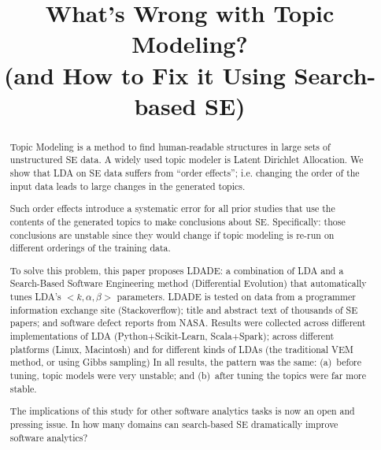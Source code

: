 \documentclass[10pt,conference]{IEEEtran}
\theoremstyle{break}
\begin{document}
\pagestyle{plain}

\title{\textbf{What's Wrong with
Topic Modeling?\\ (and How to Fix it Using Search-based SE)}}


\author{
\and
{}
\and
{}
}

\maketitle


\begin{abstract}
  Topic Modeling is a method to find
  human-readable structures in large sets of unstructured SE data.
  A widely used topic modeler is Latent Dirichlet Allocation. We show that LDA on SE data suffers
  from ``order effects''; i.e. changing the order of the input data leads to
  large changes in the generated topics.

 Such order effects introduce a systematic error for all prior studies that use
 the contents of the generated topics to make conclusions about
 SE. Specifically: those conclusions are unstable since they would change if
 topic modeling is re-run on different orderings of the training data.

To solve this problem, this paper proposes LDADE: a combination of LDA and a
Search-Based Software Engineering method
(Differential Evolution) that automatically tunes LDA's
$<k,\alpha,\beta>$ parameters. LDADE is tested on  data from a programmer
information exchange site (Stackoverflow); title and abstract text of thousands
of SE papers; and software defect reports from NASA.  Results were collected
across different implementations of LDA (Python+Scikit-Learn, Scala+Spark); across
different platforms (Linux, Macintosh) and for different kinds of LDAs (the
traditional VEM method, or using Gibbs sampling) In all results, the pattern was
the same: (a)~before tuning, topic models were very unstable; and (b)~after
tuning the topics were far more stable.
  
The implications of this study for other software analytics tasks is now an open
and pressing issue. 
In how many domains can search-based SE dramatically improve software analytics?

\end{abstract}
\end{document}
